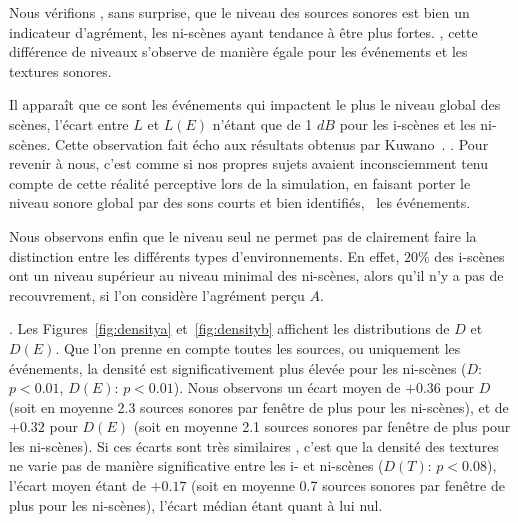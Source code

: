 Nous vérifions , sans surprise, que le niveau des sources sonores est bien un indicateur d'agrément, les ni-scènes ayant tendance à être plus fortes.  , cette différence de niveaux s'observe de manière égale pour les événements et les textures sonores. 

Il apparaît que ce sont les événements qui impactent le plus le niveau global des scènes, l'écart entre $L$ et $L(E)$ n'étant que de 1 $dB$ pour les i-scènes et les ni-scènes. Cette observation fait écho aux résultats obtenus par Kuwano~\al \citep{kuwano_memory_2003}.  . Pour revenir à nous, c'est comme si nos propres sujets avaient inconsciemment tenu compte de cette réalité perceptive lors de la simulation, en faisant porter le niveau sonore global par des sons courts et bien identifiés, \ie~les événements.

Nous observons enfin que le niveau seul ne permet pas de clairement faire la distinction entre les différents types d'environnements. En effet, $20\%$ des i-scènes ont un niveau supérieur au niveau minimal des ni-scènes, alors qu'il n'y a pas de recouvrement, si l'on considère l'agrément perçu $A$.

 . Les Figures~\ref{fig:densitya} et~\ref{fig:densityb} affichent les distributions de $D$ et $D(E)$. Que l'on prenne en compte toutes les sources, ou uniquement les événements, la densité est significativement plus élevée pour les ni-scènes ($D$: $p<0.01$, $D(E)$: $p<0.01$). Nous observons un écart moyen de $+0.36$ pour $D$ (soit en moyenne 2.3 sources sonores par fenêtre de plus pour les ni-scènes), et de $+0.32$ pour $D(E)$ (soit en moyenne 2.1 sources sonores par fenêtre de plus pour les ni-scènes). Si ces écarts sont très similaires , c'est que la densité des textures ne varie pas de manière significative entre les i- et ni-scènes ($D(T)$: $p<0.08$), l'écart moyen étant de $+0.17$ (soit en moyenne 0.7 sources sonores par fenêtre de plus pour les ni-scènes),  l'écart médian étant quant à lui nul.

